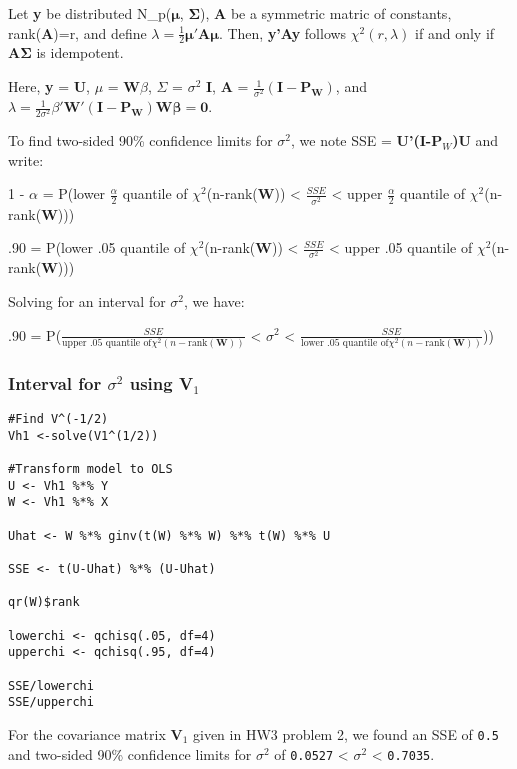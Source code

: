 \documentclass[11pt]{article}
\begin{document}
\begin{theorem} \label{quadnormchisq}
Let \textbf{y} be distributed N_p($\mathbf{\mu}$, $\mathbf{\Sigma}$), \textbf{A} be a symmetric matric of constants, rank(\textbf{A})=r, and define $\lambda = \frac{1}{2} \mathbf{\mu'A\mu}$.
Then, \textbf{y'Ay} follows $\chi^2(r,\lambda)$ if and only if $\mathbf{A\Sigma}$ is idempotent.
\end{theorem}

Here, \textbf{y} = \textbf{U}, \textbf{$\mu$} = \textbf{W$\beta$}, \textbf{$\Sigma$} = $\sigma$$^2$ \textbf{I}, \textbf{A} =
$\frac{1}{\sigma^2}(\mathbf{I} - \mathbf{P_W})$, and $\lambda =
\frac{1}{2 \sigma^2} \beta'\mathbf{W}'(\mathbf{I} -\mathbf{P_W})\mathbf{W\beta} = \mathbf{0}$. 

To find two-sided 90\% confidence limits for $\sigma$$^2$, we note SSE
= \textbf{U'(I-P$_W$)U} and write:

1 - $\alpha$ = P(lower $\frac{\alpha}{2}$ quantile of $\chi$$^2$(n-rank(\textbf{W})) <
$\frac{SSE}{\sigma^2}$ < upper $\frac{\alpha}{2}$ quantile of $\chi$$^2$(n-rank(\textbf{W})))

.90 = P(lower .05 quantile of $\chi$$^2$(n-rank(\textbf{W})) <
$\frac{SSE}{\sigma^2}$ < upper .05 quantile of $\chi$$^2$(n-rank(\textbf{W})))

Solving for an interval for $\sigma$$^2$, we have:

.90 = P($\frac{SSE}{\text{upper .05 quantile of
}\chi^2(n-\text{rank}(\mathbf{W}))}$ < $\sigma$$^2$ <
$\frac{SSE}{\text{lower .05 quantile of
}\chi^2(n-\text{rank}(\mathbf{W}))}$))
\subsubsection{Interval for $\sigma$$^2$ using \textbf{V$_1$}}
\label{sec-1-1-2}



\begin{verbatim}
#Find V^(-1/2)
Vh1 <-solve(V1^(1/2))

#Transform model to OLS
U <- Vh1 %*% Y
W <- Vh1 %*% X

Uhat <- W %*% ginv(t(W) %*% W) %*% t(W) %*% U

SSE <- t(U-Uhat) %*% (U-Uhat)

qr(W)$rank

lowerchi <- qchisq(.05, df=4)
upperchi <- qchisq(.95, df=4)

SSE/lowerchi
SSE/upperchi
\end{verbatim}

For the covariance matrix \textbf{V$_1$} given in HW3 problem 2, we found an
SSE of \texttt{0.5} and two-sided 90\% confidence
limits for $\sigma$$^2$ of \texttt{0.0527} <
$\sigma$$^2$ < \texttt{0.7035}.
\end{document}
